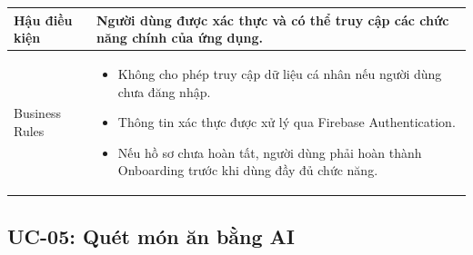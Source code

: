 \begin{longtable}{|p{4cm}|p{11cm}|}
    \hline
    Hậu điều kiện & Người dùng được xác thực và có thể truy cập các chức năng chính của ứng dụng. \\
    \hline
    Business Rules &
        \begin{itemize}[nosep]
            \item Không cho phép truy cập dữ liệu cá nhân nếu người dùng chưa đăng nhập.
            \item Thông tin xác thực được xử lý qua Firebase Authentication.
            \item Nếu hồ sơ chưa hoàn tất, người dùng phải hoàn thành Onboarding trước khi dùng đầy đủ chức năng.
        \end{itemize} \\
    \hline
\end{longtable}


\subsection{UC-05: Quét món ăn bằng AI}

